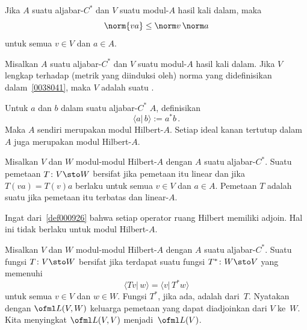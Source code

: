 \begin{prop} Jika $A$ suatu aljabar-$C^*$ dan $V$ suatu modul-$A$ hasil kali dalam, maka
  \[ \norm{va} \le \norm v\, \norm a \]
untuk semua $v \in V$ dan $a \in A$.
\end{prop}

\begin{defn} Misalkan $A$ suatu aljabar-$C^*$ dan $V$ suatu modul-$A$ hasil kali dalam. Jika $V$
lengkap terhadap (metrik yang diinduksi oleh) norma yang didefinisikan dalam~\ref{0038041},
maka $V$ adalah suatu
.
\end{defn}

\begin{exam}\label{0038111} Untuk $a$ dan $b$ dalam suatu aljabar-$C^*$ $A$,
definisikan
  \[ \langle a \vert\, b\rangle := a^*b\,. \]
Maka $A$ sendiri merupakan modul Hilbert-$A$. Setiap ideal kanan tertutup dalam $A$ juga merupakan
modul Hilbert-$A$.
\end{exam}

\begin{defn} Misalkan $V$ dan $W$ modul-modul Hilbert-$A$ dengan $A$ suatu aljabar-$C^*$. Suatu
pemetaan $T\colon V \sto W$ bersifat
 jika pemetaan itu linear dan jika $T(va) = T(v)a$ berlaku untuk semua $v \in V$ dan $a \in
A$. Pemetaan $T$ adalah suatu
 jika pemetaan itu terbatas dan linear-$A$.
\end{defn}

Ingat dari~\ref{def000926} bahwa setiap operator ruang Hilbert memiliki adjoin.
Hal ini tidak berlaku untuk modul Hilbert-$A$.

\begin{defn} Misalkan $V$ dan $W$ modul-modul Hilbert-$A$ dengan $A$ suatu aljabar-$C^*$. Suatu
fungsi $T\colon V \sto W$ bersifat
 jika terdapat suatu fungsi $T^*\colon W \sto V$ yang memenuhi
  \[ \langle Tv \vert\, w \rangle = \langle v \vert\, T^*w \rangle \]
untuk semua $v \in V$ dan $w \in W$. Fungsi $T^*$, jika ada, adalah
 dari~$T$. Nyatakan dengan
$\ofml L(V,W)$ keluarga pemetaan yang dapat diadjoinkan dari $V$ ke~$W$. Kita menyingkat $\ofml L(V,V)$
menjadi~$\ofml L(V)$.
\end{defn}

